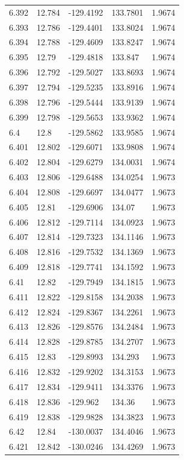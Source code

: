 \begin{tabular}{lllll}
6.392 & 12.784 & -129.4192 & 133.7801 & 1.9674 \\
6.393 & 12.786 & -129.4401 & 133.8024 & 1.9674 \\
6.394 & 12.788 & -129.4609 & 133.8247 & 1.9674 \\
6.395 & 12.79 & -129.4818 & 133.847 & 1.9674 \\
6.396 & 12.792 & -129.5027 & 133.8693 & 1.9674 \\
6.397 & 12.794 & -129.5235 & 133.8916 & 1.9674 \\
6.398 & 12.796 & -129.5444 & 133.9139 & 1.9674 \\
6.399 & 12.798 & -129.5653 & 133.9362 & 1.9674 \\
6.4 & 12.8 & -129.5862 & 133.9585 & 1.9674 \\
6.401 & 12.802 & -129.6071 & 133.9808 & 1.9674 \\
6.402 & 12.804 & -129.6279 & 134.0031 & 1.9674 \\
6.403 & 12.806 & -129.6488 & 134.0254 & 1.9673 \\
6.404 & 12.808 & -129.6697 & 134.0477 & 1.9673 \\
6.405 & 12.81 & -129.6906 & 134.07 & 1.9673 \\
6.406 & 12.812 & -129.7114 & 134.0923 & 1.9673 \\
6.407 & 12.814 & -129.7323 & 134.1146 & 1.9673 \\
6.408 & 12.816 & -129.7532 & 134.1369 & 1.9673 \\
6.409 & 12.818 & -129.7741 & 134.1592 & 1.9673 \\
6.41 & 12.82 & -129.7949 & 134.1815 & 1.9673 \\
6.411 & 12.822 & -129.8158 & 134.2038 & 1.9673 \\
6.412 & 12.824 & -129.8367 & 134.2261 & 1.9673 \\
6.413 & 12.826 & -129.8576 & 134.2484 & 1.9673 \\
6.414 & 12.828 & -129.8785 & 134.2707 & 1.9673 \\
6.415 & 12.83 & -129.8993 & 134.293 & 1.9673 \\
6.416 & 12.832 & -129.9202 & 134.3153 & 1.9673 \\
6.417 & 12.834 & -129.9411 & 134.3376 & 1.9673 \\
6.418 & 12.836 & -129.962 & 134.36 & 1.9673 \\
6.419 & 12.838 & -129.9828 & 134.3823 & 1.9673 \\
6.42 & 12.84 & -130.0037 & 134.4046 & 1.9673 \\
6.421 & 12.842 & -130.0246 & 134.4269 & 1.9673 \\

\end{tabular}
